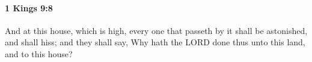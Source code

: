 
		\paragraph{1 Kings 9:8} %
			\label{1KINGS-9-8}

			And at this house, which is high, every one that passeth by it shall be astonished, and shall hiss; and they shall say, Why hath the LORD done thus unto this land, and to this house?


